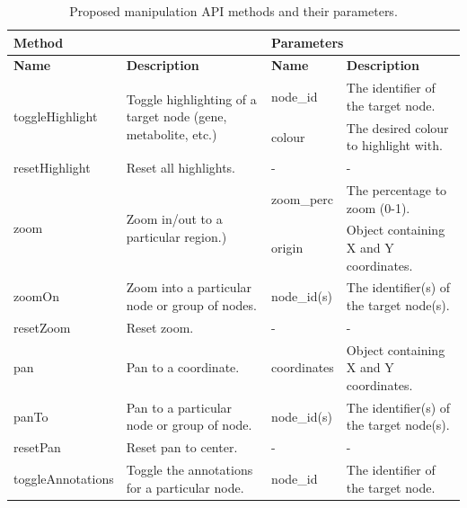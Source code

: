 \documentclass[a4paper,12pt,twoside]{apa}
\begin{document}
\begin{table}[h]
\centering
\caption{Proposed manipulation API methods and their parameters.}
\label{tbl:manipulation-api}
\begin{tabularx}{0.9\textwidth}{|X|X|X|X|}
  \hline
  \multicolumn{2}{|C|}{\textbf{Method}} & \multicolumn{2}{|C|}{\textbf{Parameters}} \\ \hline
  \textbf{Name} & \textbf{Description} & \textbf{Name} & \textbf{Description} \\ \hline

  \multirow{2}{\hsize}{toggleHighlight} & \multirow{2}{\hsize}{Toggle highlighting of a target node (gene, metabolite, etc.)}
  & node\_id & The identifier of the target node. \\ \cline{3-4}
  & & colour & The desired colour to highlight with. \\ \hline

  resetHighlight & Reset all highlights. & - & - \\ \hline

  \multirow{2}{\hsize}{zoom} & \multirow{2}{\hsize}{Zoom in/out to a particular region.)}
  & zoom\_perc & The percentage to zoom (0-1). \\ \cline{3-4}
  & & origin & Object containing X and Y coordinates. \\ \hline

  zoomOn & Zoom into a particular node or group of nodes. & node\_id(s) & The identifier(s) of the target node(s). \\ \hline

  resetZoom & Reset zoom. & - & - \\ \hline

  pan & Pan to a coordinate. & coordinates & Object containing X and Y coordinates. \\ \hline

  panTo & Pan to a particular node or group of node. & node\_id(s) & The identifier(s) of the target node(s). \\ \hline

  resetPan & Reset pan to center. & - & - \\ \hline

  toggleAnnotations & Toggle the annotations for a particular node. & node\_id & The identifier of the target node. \\ \hline
\end{tabularx}
\end{table}

\FloatBarrier
\end{document}
